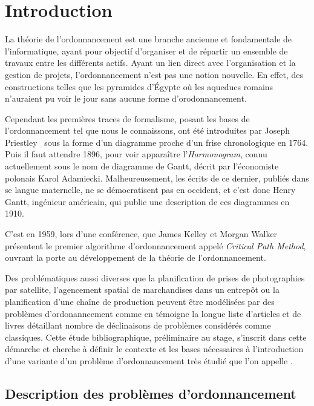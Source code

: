 \documentclass[a4paper,11pt]{report}
\begin{document}


\chapter{Introduction}

La théorie de l'ordonnancement est une branche ancienne et fondamentale de l'informatique, ayant
pour objectif d'organiser et de répartir un ensemble de travaux entre les différents actifs. Ayant
un lien direct avec l'organisation et la gestion de projets, l'ordonnancement n'est pas une notion
nouvelle. En effet, des constructions telles que les pyramides d'Égypte où les aqueducs romains
n'auraient pu voir le jour sans aucune forme d'orodonnancement.

Cependant les premières traces de formalisme, posant les bases de l'ordonnancement tel que nous
le connaissons, ont été introduites par Joseph Priestley~\cite{joseph_priestley_description_1764}
sous la forme d'un diagramme proche d'un frise chronologique en 1764. Puis il faut attendre 1896,
pour voir apparaître l'\emph{Harmonogram}, connu actuellement sous le nom de diagramme de Gantt,
décrit par l'économiste polonais Karol Adamiecki. Malheureusement, les écrits de ce dernier, publiés
dans se langue maternelle, ne se démocratisent pas en occident, et c'est donc Henry Gantt, ingénieur
américain, qui publie une description de ces diagrammes en 1910.

C'est en 1959, lors d'une conférence, que James Kelley et Morgan Walker~\cite{kelley1959critical}
présentent le premier algorithme d'ordonnancement appelé \emph{Critical Path Method}, ouvrant la
porte au développement de la théorie de l'ordonnancement.

Des problématiques aussi diverses que la planification de prises de photographies par satellite,
l'agencement spatial de marchandises dans un entrepôt ou la planification d'une chaîne de production
peuvent être modélisées par des problèmes d'ordonanncement comme en témoigne la longue liste
d'articles et de livres détaillant nombre de déclinaisons de problèmes
considérés comme classiques. Cette étude bibliographique, préliminaire au stage, s'inscrit dans cette
démarche et cherche à définir le contexte et les bases nécessaires à l'introduction d'une variante
d'un problème d'ordonnancement très étudié que l'on appelle \isched{}.

\section{Description des problèmes d'ordonnancement}
\end{document}

